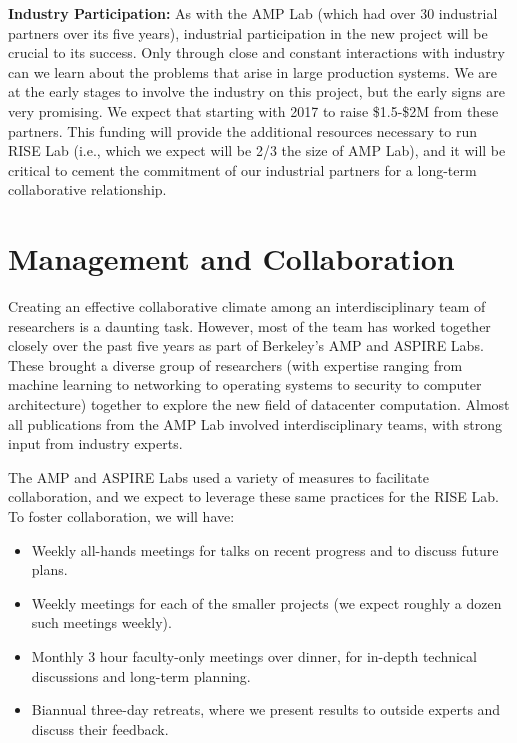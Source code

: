 {\bf Industry Participation:} As with the AMP  Lab (which had over 30 industrial partners over its five years), industrial participation in the new project will be crucial to its success.  Only through close and constant interactions with industry can we learn about the problems that arise in large production systems.  We are at the early stages to involve the industry on this project, but the early signs are very promising. We expect that starting with 2017 to raise \$1.5-\$2M from these partners. This funding will provide the additional resources necessary to run RISE Lab (i.e., which we expect will be 2/3 the size of AMP Lab), and it will be critical to cement the commitment of our industrial partners for a long-term collaborative relationship.

\section{Management and Collaboration}

Creating an effective collaborative climate among an interdisciplinary team of researchers is a daunting task. However, most of the team has worked together closely over the past five years as part of Berkeley's AMP and ASPIRE Labs.  These brought a diverse group of researchers (with expertise ranging from machine learning to networking to operating systems to security to computer architecture) together to explore the new field of datacenter computation. Almost all publications from the AMP Lab involved interdisciplinary teams, with strong input from industry experts.

The AMP and ASPIRE Labs used a variety of measures to facilitate collaboration, and we expect to leverage these same practices for the RISE Lab.   To foster collaboration, we will have:

\begin{itemize}[noitemsep,topsep=0pt,parsep=0pt,partopsep=0pt]
\item Weekly all-hands meetings for talks on recent progress and to discuss future plans.
\item  Weekly meetings for each of the smaller projects (we expect roughly a dozen such meetings weekly).
\item  Monthly 3 hour faculty-only meetings over dinner, for in-depth technical discussions and long-term planning.
\item  Biannual three-day retreats, where we present results to outside experts 
and discuss their feedback.
\end{itemize}

